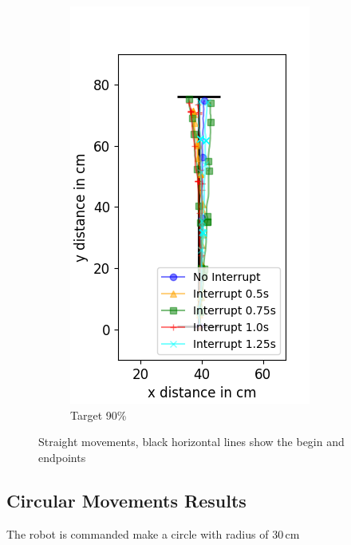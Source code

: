 \begin{figure}
\begin{subfigure}[b]{0.32\textwidth}
		\includegraphics[width=\textwidth]{pics/straight_90.png}
		\caption{Target 90\%}
		\label{fig:stra_exp3}
	\end{subfigure}
	\caption{Straight movements, black horizontal lines show the begin and endpoints}
\end{figure}


\subsection{Circular Movements Results}

The robot is commanded make a circle with radius of 30\,cm



